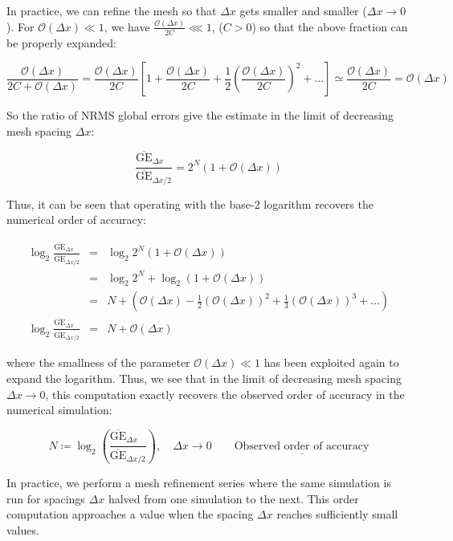\documentclass[11pt,titlepage]{report}
\begin{document}
\noindent In practice, we can refine the mesh so that $\Delta x$ gets smaller and smaller ($\Delta x \rightarrow 0$). For $\mathcal{O}(\Delta x) \ll 1$, we have $\tfrac{\mathcal{O}(\Delta x)}{2C} \lll 1$, ($C > 0$) so that the above fraction can be properly expanded:

$$\frac{\mathcal{O}(\Delta x)}{2C + \mathcal{O}(\Delta x)} = \frac{\mathcal{O}(\Delta x)}{2C}\left[1 + \frac{\mathcal{O}(\Delta x)}{2C} + \frac{1}{2}\left(\frac{\mathcal{O}(\Delta x)}{2C}\right)^2 + \ldots \right] \simeq \frac{\mathcal{O}(\Delta x)}{2C} = \mathcal{O}(\Delta x)$$

\noindent So the ratio of NRMS global errors give the estimate in the limit of decreasing mesh spacing $\Delta x$:

$$\frac{\overline{\text{GE}}_{\Delta x\phantom{/2}}}{\overline{\text{GE}}_{\Delta x / 2}}  =  2^N(1 + \mathcal{O}(\Delta x))$$

\noindent Thus, it can be seen that operating with the base-2 logarithm recovers the numerical order of accuracy:

\begin{eqnarray*}
\log_2 \frac{\overline{\text{GE}}_{\Delta x\phantom{/2}}}{\overline{\text{GE}}_{\Delta x / 2}} &  = &  \log_2 2^N(1 + \mathcal{O}(\Delta x)) \\
 &  = &  \log_2 2^N + \log_2 (1 + \mathcal{O}(\Delta x)) \\
 &  = &  N + (\mathcal{O}(\Delta x) - \frac{1}{2}(\mathcal{O}(\Delta x))^2 + \frac{1}{3}(\mathcal{O}(\Delta x))^3 + \ldots) \\
\log_2 \frac{\overline{\text{GE}}_{\Delta x\phantom{/2}}}{\overline{\text{GE}}_{\Delta x / 2}} & = & N + \mathcal{O}(\Delta x)
\end{eqnarray*}

\noindent where the smallness of the parameter $\mathcal{O}(\Delta x) \ll 1$ has been exploited again to expand the logarithm. Thus, we see that in the limit of decreasing mesh spacing $\Delta x \rightarrow 0$, this computation exactly recovers the observed order of accuracy in the numerical simulation:

\begin{equation}
\label{eq:Order}
\boxed{N \coloneqq \log_2 \left(\frac{\overline{\text{GE}}_{\Delta x\phantom{/ 2}}}{\overline{\text{GE}}_{\Delta x / 2}} \right), \quad \Delta x \rightarrow 0} \qquad \underline{\text{Observed order of accuracy}}
\end{equation}

\noindent In practice, we perform a mesh refinement series where the same simulation is run for spacings $\Delta x$ halved from one simulation to the next. This order computation approaches a value when the spacing $\Delta x$ reaches sufficiently small values.
\end{document}
